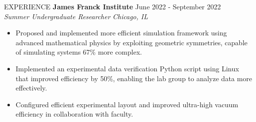 \documentclass{resume} %
\begin{document}
\begin{rSection}{EXPERIENCE}
\textbf{James Franck Institute} \hfill June 2022  - September 2022 \\
\textit{Summer Undergraduate Researcher} \hfill \textit{Chicago, IL}
\vspace{-0.6em}
 \begin{itemize}
   \itemsep -5.8pt {}
   \item Proposed and implemented more efficient simulation framework using advanced mathematical physics by exploiting geometric symmetries, capable of simulating systems 67\% more complex.
   \item Implemented an experimental data verification Python script using Linux that improved efficiency by 50\%, enabling the lab group to analyze data more effectively.
   \item Configured efficient experimental layout and improved ultra-high vacuum efficiency in collaboration with faculty.
    
 \end{itemize}

\end{rSection} 
\end{document}
